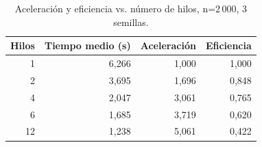 \begin{table}[H]\centering
\caption{Aceleración y eficiencia vs. número de hilos, n=2\,000, 3 semillas.}
\label{tab:aceleracion}
\begin{tabular}{rrrr}\toprule
\rowcolor{gray!25}
\textbf{Hilos} & \textbf{Tiempo medio (s)} & \textbf{Aceleración} & \textbf{Eficiencia} \\\midrule
1 & 6,266 & 1,000 & 1,000 \\
2 & 3,695 & 1,696 & 0,848 \\
4 & 2,047 & 3,061 & 0,765 \\
6 & 1,685 & 3,719 & 0,620 \\
12 & 1,238 & 5,061 & 0,422 \\
\bottomrule\end{tabular}\end{table}
